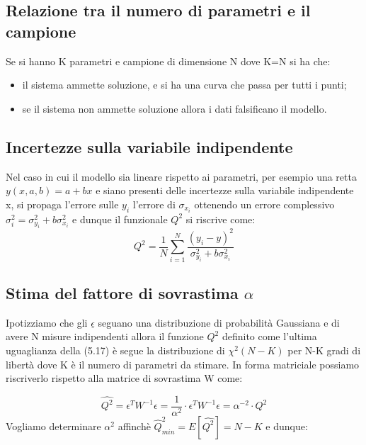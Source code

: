 \documentclass[11pt,a4paper]{book}
\begin{document}
\subsection{Relazione tra il numero di parametri e il campione}

Se si hanno K parametri e campione di dimensione N dove K=N  si ha che:

\begin{itemize}
	\item il sistema ammette soluzione, e si ha una curva che passa per tutti i punti;
	\item se il sistema non ammette soluzione allora i dati falsificano il modello.
\end{itemize}

\subsection{Incertezze sulla variabile indipendente}

Nel caso in cui il modello sia lineare rispetto ai parametri, per esempio una retta $y(x,a,b) = a +bx$ e siano presenti delle incertezze sulla variabile indipendente x, si propaga l'errore sulle $y_i$ l'errore di $\sigma_{x_{i}}$ ottenendo un errore complessivo $\sigma_{i}^2 = \sigma_{y_{i}}^2 + b \sigma_{x_{i}}^2$ e dunque il funzionale $Q^2$ si riscrive come:
\begin{equation}
	Q^2 = \dfrac{1}{N}\sum_{i=1}^N\dfrac{(y_i - y)^2}{\sigma_{y_{i}}^2 + b \sigma_{x_{i}}^2}
\end{equation}
\subsection{Stima del fattore di sovrastima $\alpha$}

Ipotizziamo che gli $\underline{\epsilon}$ seguano una distribuzione di probabilit\`{a} Gaussiana e di avere N misure indipendenti allora il funzione $Q^2$ definito come l'ultima uguaglianza della (5.17) \`{e} segue la distribuzione di $\chi^2(N-K)$ per N-K gradi di libert\`{a} dove K \`{e} il numero di parametri da stimare. In forma matriciale possiamo riscriverlo rispetto alla matrice di sovrastima W come:

\begin{equation}
	\hat{Q^{2}} = \epsilon^TW^{-1}\epsilon = \dfrac{1}{\alpha^2} \cdot \epsilon^TW^{-1}\epsilon = \alpha ^{-2}\cdot Q^2
\end{equation}
Vogliamo determinare $\alpha^2$ affinch\`{e} $\hat{Q}_{min}^{2} = E[\hat{Q^2}] = N-K$ e dunque:
\end{document}
